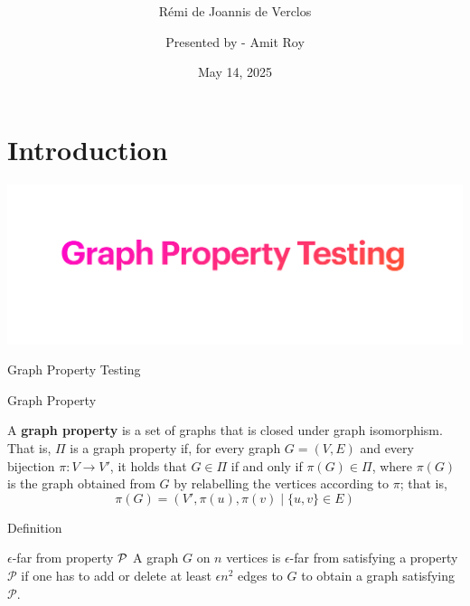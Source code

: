 \documentclass{beamer}
\title{ \sc \color{blue}{Chordal graphs are easily testable}}
\subtitle{Rémi de Joannis de Verclos}
\author{Presented by - Amit Roy  }
\institute{Spring School 2025}
\date{May 14, 2025}
\begin{document}
 
\begin{frame}
\titlepage
\end{frame} 



\section{Introduction}

\begin{frame}
	\includegraphics[scale=0.4]{graph-property-testing}
\end{frame}

\begin{frame}{Graph Property Testing}
	
	\begin{block}{Graph Property}
		
	A {\bf graph property} is a set of graphs that is closed under graph
	isomorphism. That is, $\Pi$ is a graph property if, for every graph $G = (V, E)$ and every bijection
	$\pi : V \to V '$, it holds that $G \in \Pi$ if and only if $\pi(G) \in\Pi$, where $\pi(G)$ is the graph obtained from $G$
	by relabelling the vertices according to $\pi$; that is,
	$$\pi(G) = (V', {{\pi(u),\pi(v)} \mid \{u,v\} \in E} )$$
	\end{block}


	
\end{frame}


\begin{frame}{Definition}
	\begin{block}{$\epsilon$-far from property ${\cal P}$}
	A graph $G$ on $n$ vertices is $\epsilon$-far from satisfying a property $\mathcal{P}$ if one has to add
	or delete at least $\epsilon n^2$ edges to $G$ to obtain a graph satisfying $\mathcal{P}$.
	\end{block}
\end{frame}
\end{document}
